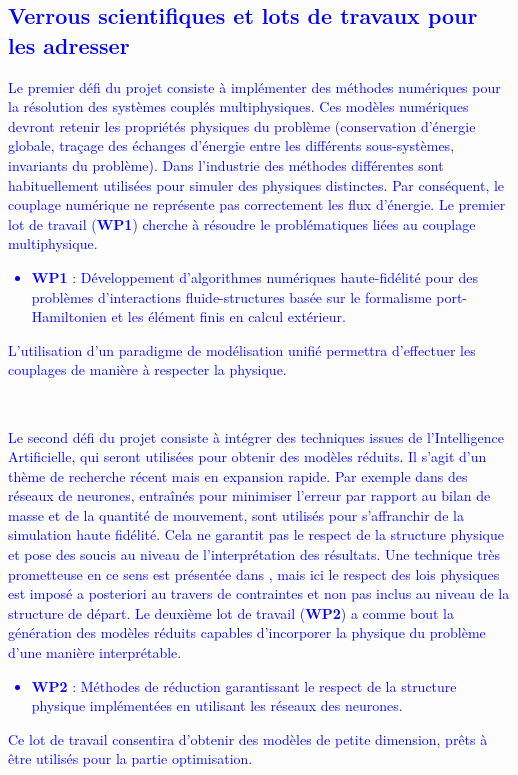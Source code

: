 \documentclass[12pt, french]{article}
\newcommand{\review}[1]{\textcolor{blue}{#1}}
\begin{document}
\review{
\subsection{Verrous scientifiques et lots de travaux pour les adresser}
Le premier défi du projet consiste à implémenter des méthodes numériques pour la résolution des systèmes couplés multiphysiques. Ces modèles numériques devront retenir les propriétés physiques du problème (conservation d’énergie globale, traçage des échanges d’énergie entre les différents sous-systèmes, invariants du problème). Dans l'industrie des méthodes différentes sont habituellement utilisées pour simuler des physiques distinctes. Par conséquent, le couplage numérique ne représente pas correctement les flux d’énergie. Le premier lot de travail (\textbf{WP1}) cherche à résoudre le problématiques liées au couplage multiphysique. 
\begin{itemize}
	\item \textbf{WP1} : Développement d'algorithmes numériques haute-fidélité pour des problèmes d'interactions fluide-structures basée sur le formalisme port-Hamiltonien et les élément finis en calcul extérieur.
\end{itemize}
L’utilisation d’un paradigme de modélisation unifié permettra d’effectuer les couplages de manière à respecter la physique.}\\

\review{
Le second défi du projet consiste à intégrer des techniques issues de l'Intelligence
Artificielle, qui seront utilisées pour obtenir des modèles réduits. Il s'agit d'un thème de recherche récent mais en expansion rapide. Par exemple dans \cite{sun2020physics} des réseaux de neurones, entraînés pour minimiser l'erreur par rapport au bilan de masse et de la quantité de mouvement, sont utilisés pour s'affranchir de la simulation haute fidélité. Cela ne garantit pas le respect de la structure physique et pose des soucis au niveau de l'interprétation des résultats. Une technique très prometteuse en ce sens est présentée dans \cite{lee2020}, mais ici le respect des lois physiques est imposé a posteriori au travers de contraintes et non pas inclus au niveau de la structure de départ. Le deuxième lot de travail (\textbf{WP2}) a comme bout la génération des modèles réduits capables d'incorporer la physique du problème d'une manière interprétable.
\begin{itemize}
	\item \textbf{WP2} : Méthodes de réduction garantissant le respect de la structure physique implémentées en utilisant les réseaux des neurones.
\end{itemize}
Ce lot de travail consentira d'obtenir des modèles de petite dimension, prêts à être utilisés pour la partie optimisation.}\\ 
\end{document}
